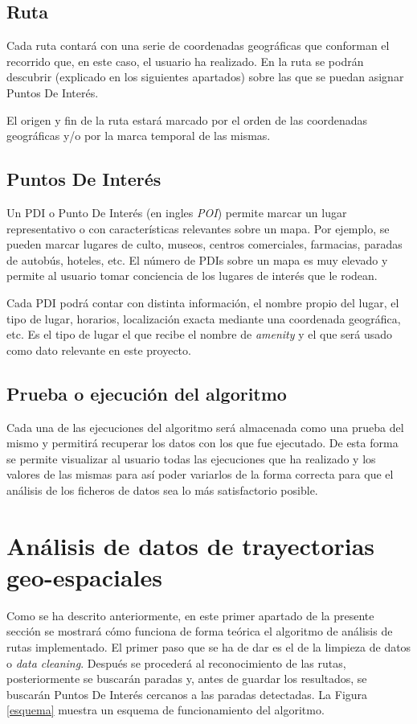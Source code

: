 \subsection{Ruta}
Cada ruta contará con una serie de coordenadas geográficas que conforman el recorrido que, en este caso, el usuario ha realizado. En la ruta se podrán descubrir  (explicado en los siguientes apartados) sobre las que se puedan asignar Puntos De Interés.

El origen y fin de la ruta estará marcado por el orden de las coordenadas geográficas y/o por la marca temporal de las mismas. 

\subsection{Puntos De Interés}
Un PDI o Punto De Interés (en ingles \textit{POI}) permite marcar un lugar representativo o con características relevantes sobre un mapa. Por ejemplo, se pueden marcar lugares de culto, museos, centros comerciales, farmacias, paradas de autobús, hoteles, etc. El número de PDIs sobre un mapa es muy elevado y permite al usuario tomar conciencia de los lugares de interés que le rodean.

Cada PDI podrá contar con distinta información, el nombre propio del lugar, el tipo de lugar, horarios, localización exacta mediante una coordenada geográfica, etc. Es el tipo de lugar el que recibe el nombre de \textit{amenity} y el que será usado como dato relevante en este proyecto.

\subsection{Prueba o ejecución del algoritmo}
Cada una de las ejecuciones del algoritmo será almacenada como una prueba del mismo y permitirá recuperar los datos con los que fue ejecutado. De esta forma se permite visualizar al usuario todas las ejecuciones que ha realizado y los valores de las mismas para así poder variarlos de la forma correcta para que el análisis de los ficheros de datos sea lo más satisfactorio posible.

\section{Análisis de datos de trayectorias geo-espaciales}
Como se ha descrito anteriormente, en este primer apartado de la presente sección se mostrará cómo funciona de forma teórica el algoritmo de análisis de rutas implementado. El primer paso que se ha de dar es el de la limpieza de datos o \textit{data cleaning}. Después se procederá al reconocimiento de las rutas, posteriormente se buscarán paradas y, antes de guardar los resultados, se buscarán Puntos De Interés cercanos a las paradas detectadas. La Figura \ref{esquema} muestra un esquema de funcionamiento del algoritmo.

